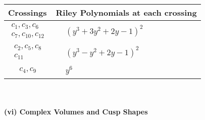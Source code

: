 \documentclass[1p]{elsarticle_modified}
\theoremstyle{definition}
\begin{document}
\begin{tabular}{m{50pt}|m{274pt}}
Crossings & \hspace{64pt}Riley Polynomials at each crossing \\
\hline $$\begin{aligned}c_{1},c_{3},c_{6}\\c_{7},c_{10},c_{12}\end{aligned}$$&$\begin{aligned}
&(y^3+3 y^2+2 y-1)^2
\end{aligned}$\\
\hline $$\begin{aligned}c_{2},c_{5},c_{8}\\c_{11}\end{aligned}$$&$\begin{aligned}
&(y^3- y^2+2 y-1)^2
\end{aligned}$\\
\hline $$\begin{aligned}c_{4},c_{9}\end{aligned}$$&$\begin{aligned}
&y^6
\end{aligned}$\\
\hline
\end{tabular}\\~\\
\newpage\flushleft \textbf{(vi) Complex Volumes and Cusp Shapes}
\end{document}
